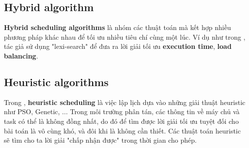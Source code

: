 \documentclass{my_style}
\begin{document}
\subsection{Hybrid algorithm}
\textbf{Hybrid scheduling algorithms} là nhóm các thuật toán mà kết hợp nhiều phương pháp khác nhau để tối ưu nhiều tiêu chí cùng một lúc. Ví dụ như trong \cite{12}, tác giả sử dụng "lexi-search" để đưa ra lời giải tối ưu 
\textbf{execution time}, \textbf{load balancing}.

\subsection{Heuristic algorithms}
Trong \cite{8}\cite{10}, \textbf{heuristic scheduling} là việc lập lịch dựa vào những giải thuật heuristic như 
PSO, Genetic, ... Trong môi trường phân tán, các thông tin về máy chủ và task có thể là không đồng nhất, do đó để tìm được lời giải tối ưu tuyệt đối cho bài toán là vô cùng khó, và đôi khi là không cần thiết. Các thuật toán heuristic sẽ tìm cho ta lời giải "chấp nhận được" trong thời gian cho phép.
\end{document}

